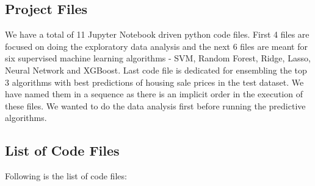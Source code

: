 \documentclass[sigconf]{acmart}
\begin{document}
    \subsection{Project Files}
    We have a total of 11 Jupyter Notebook driven python code files. First 4 files are focused on doing the exploratory data analysis and the next 6 files are meant for six supervised machine learning algorithms - SVM, Random Forest, Ridge, Lasso, Neural Network and XGBoost. Last code file is dedicated for ensembling the top 3 algorithms with best predictions of housing sale prices in the test dataset. We have named them in a sequence as there is an implicit order in the execution of these files. We wanted to do the data analysis first before running the predictive algorithms. 
        
    \subsection{List of Code Files}    
    Following is the list of code files:
\end{document}
